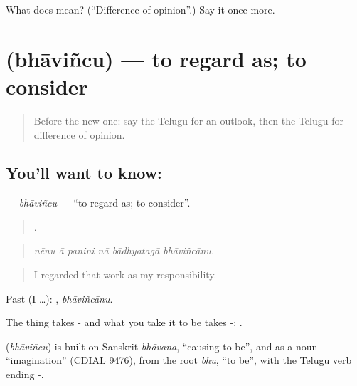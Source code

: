 \begin{tcolorbox}[breakable,colback=teal!4,colframe=teal!35!black,title={Before you move on}]
What does  mean? (\textquotedblleft{}Difference of opinion\textquotedblright{}.) Say it once more.
\end{tcolorbox}
\section[\texorpdfstring{\te{భావించు} (bhāviñcu)}{భావించు (bhāviñcu)}]{ (bhāviñcu) — to regard as; to consider}

\label{lesson:TE-C382-bhavincu}



\begin{quote}
Before the new one: say the Telugu for an outlook, then the Telugu for difference of opinion.
\end{quote}

\subsection*{You'll want to know: }
\textbf{} — \emph{bhāviñcu} — \textquotedblleft{}to regard as; to consider\textquotedblright{}.

\begin{quote}
     .
\end{quote}

\begin{quote}
\emph{nēnu ā panini nā bādhyatagā bhāviñcānu.}
\end{quote}

\begin{quote}
I regarded that work as my responsibility.
\end{quote}

Past (I …): , \emph{bhāviñcānu}.

The thing takes - and what you take it to be takes -:   .

\begin{cousinweb}
\textbf{} (\emph{bhāviñcu}) is built on Sanskrit \emph{bhāvana}, \textquotedblleft{}causing to be\textquotedblright{}, and as a noun \textquotedblleft{}imagination\textquotedblright{} (CDIAL 9476), from the root \emph{bhū}, \textquotedblleft{}to be\textquotedblright{}, with the Telugu verb ending -.
\end{cousinweb}

